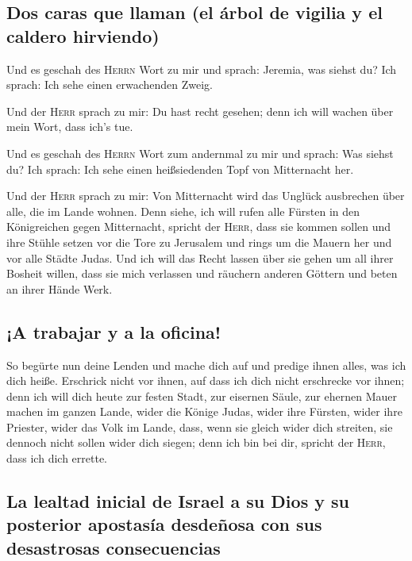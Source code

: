 \hypertarget{dos-caras-que-llaman-el-uxe1rbol-de-vigilia-y-el-caldero-hirviendo}{%
\subsection{Dos caras que llaman (el árbol de vigilia y el caldero
hirviendo)}\label{dos-caras-que-llaman-el-uxe1rbol-de-vigilia-y-el-caldero-hirviendo}}

 Und es geschah des \textsc{Herrn} Wort zu mir und
sprach: Jeremia, was siehst du? Ich sprach: Ich sehe einen erwachenden
Zweig.

 Und der \textsc{Herr} sprach zu mir: Du hast recht
gesehen; denn ich will wachen über mein Wort, dass ich's tue.

 Und es geschah des \textsc{Herrn} Wort zum andernmal zu
mir und sprach: Was siehst du? Ich sprach: Ich sehe einen heißsiedenden
Topf von Mitternacht her.

 Und der \textsc{Herr} sprach zu mir: Von Mitternacht
wird das Unglück ausbrechen über alle, die im Lande wohnen.
 Denn siehe, ich will rufen alle Fürsten in den
Königreichen gegen Mitternacht, spricht der \textsc{Herr}, dass sie
kommen sollen und ihre Stühle setzen vor die Tore zu Jerusalem und rings
um die Mauern her und vor alle Städte Judas.  Und ich
will das Recht lassen über sie gehen um all ihrer Bosheit willen, dass
sie mich verlassen und räuchern anderen Göttern und beten an ihrer Hände
Werk.

\hypertarget{a-trabajar-y-a-la-oficina}{%
\subsection{¡A trabajar y a la
oficina!}\label{a-trabajar-y-a-la-oficina}}

 So begürte nun deine Lenden und mache dich auf und
predige ihnen alles, was ich dich heiße. Erschrick nicht vor ihnen, auf
dass ich dich nicht erschrecke vor ihnen;  denn ich will
dich heute zur festen Stadt, zur eisernen Säule, zur ehernen Mauer
machen im ganzen Lande, wider die Könige Judas, wider ihre Fürsten,
wider ihre Priester, wider das Volk im Lande,  dass, wenn
sie gleich wider dich streiten, sie dennoch nicht sollen wider dich
siegen; denn ich bin bei dir, spricht der \textsc{Herr}, dass ich dich
errette.

\hypertarget{la-lealtad-inicial-de-israel-a-su-dios-y-su-posterior-apostasuxeda-desdeuxf1osa-con-sus-desastrosas-consecuencias}{%
\subsection{La lealtad inicial de Israel a su Dios y su posterior
apostasía desdeñosa con sus desastrosas
consecuencias}\label{la-lealtad-inicial-de-israel-a-su-dios-y-su-posterior-apostasuxeda-desdeuxf1osa-con-sus-desastrosas-consecuencias}}

